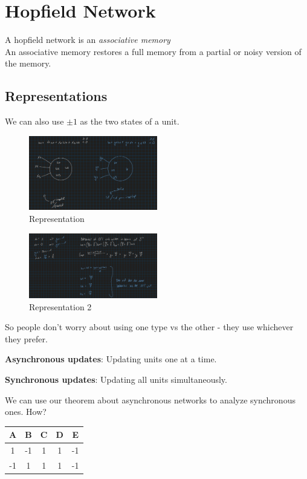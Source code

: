 \documentclass{article}
\begin{document}
\section{Hopfield Network}

A hopfield network is an \textit{associative memory}\\
An associative memory restores a full memory from a partial or noisy version of the memory.

\subsection{Representations}

We can also use $\pm 1$ as the two states of a unit.

\begin{figure}[H]
\centering
\includegraphics[width=0.5\textwidth]{assets/representation.png}
\caption{Representation}
\end{figure}

\begin{figure}[H]
\centering
\includegraphics[width=0.5\textwidth]{assets/representation2.png}
\caption{Representation 2}
\end{figure}

\noindent So people don't worry about using one type vs the other - they use whichever they prefer.

\noindent \textbf{Asynchronous updates}: Updating units one at a time.

\noindent \textbf{Synchronous updates}: Updating all units simultaneously.

\noindent We can use our theorem about asynchronous networks to analyze synchronous ones. How?

\begin{center}
\begin{tabular}{ |c|c|c|c|c| }
\hline
A & B & C & D & E \\
\hline
1 & -1 & 1 & 1 & -1 \\
-1 & 1 & 1 & 1 & -1 \\
\hline
\end{tabular}
\end{center}
\end{document}
